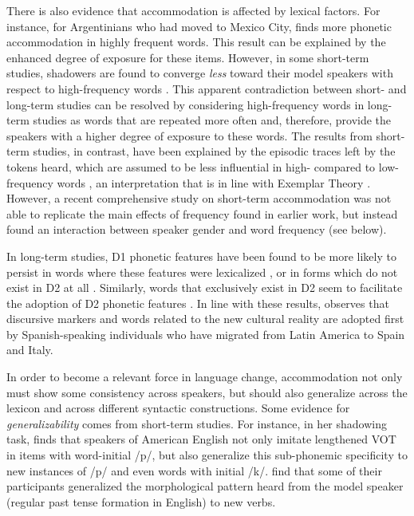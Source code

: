 \documentclass[output=paper]{langscibook}
\begin{document}
There is also evidence that accommodation is affected by lexical factors. For instance, for Argentinians who had moved to Mexico City, \citet{pesqueira_cambio_2008} finds more phonetic accommodation in highly frequent words. This result can be explained by the enhanced degree of exposure for these items. However, in some short-term studies, shadowers are found to converge \textit{less} toward their model speakers with respect to high-frequency words \parencite{goldinger_echoes_1998,goldinger_episodic_2004,babel_dialect_2010,nielsen_specificity_2011}. This apparent contradiction between short- and long-term studies can be resolved by considering high-frequency words in long-term studies as words that are repeated more often and, therefore, provide the speakers with a higher degree of exposure to these words. The results from short-term studies, in contrast, have been explained by the episodic traces left by the tokens heard, which are assumed to be less influential in high- compared to low-frequency words \citep{goldinger_echoes_1998}, an interpretation that is in line with Exemplar Theory \citep{pierrehumbert_exemplar_2001}. However, a recent comprehensive study on short-term accommodation \citep{pardo_phonetic_2017} was not able to replicate the main effects of frequency found in earlier work, but instead found an interaction between speaker gender and word frequency (see below).

In long-term studies, D1 phonetic features have been found to be more likely to persist in words where these features were lexicalized \citep{auer_subjective_1998}, or in forms which do not exist in D2 at all \citep{pesqueira_cambio_2008}. Similarly, words that exclusively exist in D2 seem to facilitate the adoption of D2 phonetic features \citep{pesqueira_cambio_2008}. In line with these results, \citet{Bonomi2010} observes that discursive markers and words related to the new cultural reality are adopted first by Spanish-speaking individuals who have migrated from Latin America to Spain and Italy.

In order to become a relevant force in language change, accommodation not only must show some consistency across speakers, but should also generalize across the lexicon and across different syntactic constructions.
Some evidence for \textit{generalizability} comes from short-term studies. For instance, in her shadowing task, \textcite{nielsen_specificity_2011} finds that speakers of American English not only imitate lengthened VOT in items with word-initial /p/, but also generalize this sub-phonemic specificity to new instances of /p/ and even words with initial /k/. \textcite{beckner_participants_2016} find that some of their participants generalized the  morphological pattern heard from the model speaker (regular past tense formation in English) to new verbs.
\end{document}
